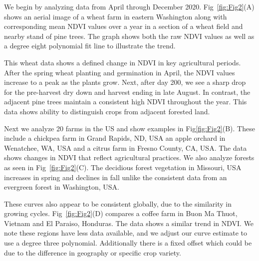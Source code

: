We begin by analyzing data from April through December 2020. Fig~\ref{fig:Fig2}(A) shows an aerial image of a wheat farm in eastern Washington along with corresponding mean NDVI values over a year in a section of a wheat field and nearby stand of pine trees. The graph shows both the raw NDVI values as well as a degree eight polynomial fit line to illustrate the trend.


This wheat data shows a defined change in NDVI in key agricultural periods. After the spring wheat planting and germination in April, the NDVI values increase to a peak as the plants grow. Next, after day 200, we see a sharp drop for the pre-harvest dry down and harvest ending in late August. In contrast, the adjacent pine trees maintain a consistent high NDVI throughout the year. This data shows ability to distinguish crops from adjacent forested land.

Next we analyze 20 farms in the US and show examples in Fig\ref{fig:Fig2}(B). These include a chickpea farm in Grand Rapids, ND, USA an apple orchard in Wenatchee, WA, USA and a citrus farm in Fresno County, CA, USA. The data shows changes in NDVI that reflect agricultural practices. We also analyze forests as seen in Fig~\ref{fig:Fig2}(C). The decidious forest vegetation in Missouri, USA increases in spring and declines in fall unlike the consistent data from an evergreen forest in Washington, USA.

These curves also appear to be consistent globally, due to the similarity in growing cycles. Fig~\ref{fig:Fig2}(D) compares a coffee farm in Buon Ma Thuot, Vietnam and El Paraiso, Honduras. The data shows a similar trend in NDVI. We note these regions have less data available, and we adjust our curve estimate to use a degree three polynomial. Additionally there is a fixed offset which could be due to the difference in geography or specific crop variety.





